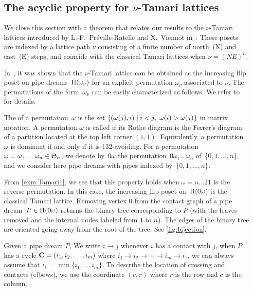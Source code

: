 \subsection{The acyclic property for $\nu$-Tamari lattices} 
\label{subsec:nuTamari} 

We close this section with a theorem that relates our results to the $\nu$-Tamari lattices introduced by L.-F.~Préville-Ratelle and X.~Viennot in~\cite{PrevilleRatelleViennot}. These posets are indexed by a lattice path $\nu$ consisting of a finite number of north~(N) and east~(E) steps, and coincide with the classical Tamari lattices when $\nu=(NE)^n$.

In~\cite{CeballosPadrolSarmiento}, it was shown that the $\nu$-Tamari lattice can be obtained as the increasing flip poset on pipe dreams~$\Pi(\omega_\nu)$ for an explicit permutation $\omega_\nu$ associated to $\nu$. The permutations of the form~$\omega_\nu$ can be easily characterized as follows. We refer to~\cite{CeballosPadrolSarmiento} for details. 

The  of a permutation~$\omega$ is the set $\set{(\omega(j),i)}{i<j,\ \omega(i)>\omega(j)}$ in matrix notation.
A permutation $\omega$ is called  if its Rothe diagram is the Ferrer's diagram of a partition located at the top left corner $(1,1)$. Equivalently, a permutation~$\omega$ is dominant if and only if it is 132-avoiding. 
For a permutation~$\omega = \omega_1 \dots \omega_n \in \mathfrak{S}_n$, we denote by~$0\omega$ the permutation~$0 \omega_1 \dots \omega_n$ of~$\{0, 1, \dots, n\}$, and we consider here pipe dreams with pipes indexed by~$\{0, 1, \dots, n\}$. 


From \cref{exm:Tamari1}, we see that this property holds when $\omega=n\dots21$ is the reverse permutation. 
In this case, the increasing flip poset on~$\Pi(0 \omega)$ is the classical Tamari lattice. Removing vertex $0$ from the contact graph of a pipe dream~$ P\in \Pi(0 \omega)$ returns the binary tree corresponding to $P$ (with the leaves removed and the internal nodes labeled from $1$ to $n$).
The edges of the binary tree are oriented going away from the root of the tree.  
See \cref{fig:bijection}. 

Given a pipe dream $P$, We write $i\to j$ whenever $i$ has a contact with $j$,
when $P$ has a cycle ${\bf C}=(i_1, i_2, \ldots, i_m)$ where $i_1 \to i_2\to\cdots\to i_m\to i_1$, we can always assume that $i_1=\min\{i_1,\ldots,i_m\}$.
To describe the location of crossing and contacts (elbows), we use the coordinate $(c,r)$ where $r$ is the row and $c$ is the column.

